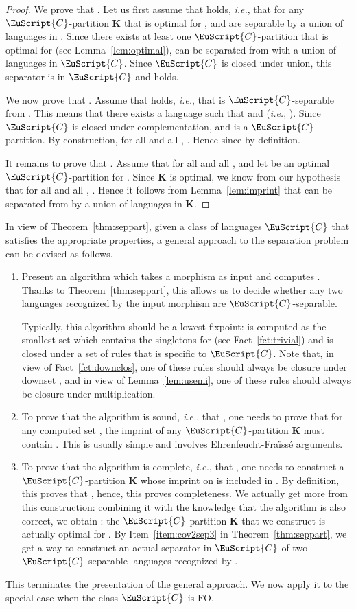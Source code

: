 \documentclass{CSML}
\newcommand\Cs{\ensuremath{\EuScript{C}}\xspace}
\newcommand\Kb{\ensuremath{\mathbf{K}}\xspace}
\newcommand{\efgame}{Ehrenfeucht-Fra\"iss\'e\xspace}
\newcommand{\fo}{\ensuremath{\text{FO}}\xspace}
\theoremstyle{plain}
\begin{document}
\begin{proof}
  We prove that .
  Let us first assume that  holds, \emph{i.e.},
  that for any \Cs-partition \Kb that is optimal for , 
  and  are separable by a union of languages in . Since
  there exists at least one \Cs-partition that is optimal for 
  (see Lemma~\ref{lem:optimal}),  can be separated from 
  with a union of languages in \Cs. Since \Cs is closed under union,
  this separator is in \Cs and  holds.

  We now prove that . Assume that  holds,
  \emph{i.e.}, that  is \Cs-separable from . This means that
  there exists a language  such that  and  (\emph{i.e.}, ). Since
  \Cs is closed under complementation,  and
   is a \Cs-partition. By construction,
  for all  and all , . Hence  since
   by definition.

  It remains to prove that . Assume that for all  and all ,  and let  be an
  optimal \Cs-partition for . Since \Kb is optimal, we know
  from our hypothesis that for all  and all , . Hence it
  follows from Lemma~\ref{lem:imprint} that  can be
  separated from  by a union of languages in \Kb.
\end{proof}

In view of Theorem~\ref{thm:seppart}, given a class of languages \Cs
that satisfies the appropriate properties, a general approach to the
separation problem can be devised as follows.
\begin{enumerate}
\item Present an algorithm which takes a morphism  as input and computes . Thanks to
  Theorem~\ref{thm:seppart}, this allows us to decide whether any two
  languages recognized by the input morphism  are \Cs-separable.

  Typically, this
  algorithm should be a lowest fixpoint:  is computed
  as the smallest set  which contains the singletons
   for  (see Fact~\ref{fct:trivial})
  and is closed under a set of rules that is specific to \Cs. Note
  that, in view of Fact~\ref{fct:downclos}, one of these rules should always be closure under downset , and in view of Lemma~\ref{lem:usemi}, one of these rules should
  always be closure under multiplication.

\item To prove that the algorithm is sound, \emph{i.e.}, that
  , one needs to prove that
  for any computed set , the imprint of any \Cs-partition \Kb must
  contain . This is usually simple and involves \efgame arguments.
\item To prove that the algorithm is complete, \emph{i.e.}, that
  , one needs to construct
  a \Cs-partition \Kb whose imprint on  is included in
  . By definition, this proves that , hence, this
  proves completeness. We actually get more from this construction:
  combining it with the knowledge that the algorithm is also correct,
  we obtain : the
  \Cs-partition \Kb that we construct is actually optimal for
  . By Item~\ref{item:cov2sep3} in Theorem~\ref{thm:seppart}, we get
  a way to construct an actual separator in \Cs of two \Cs-separable languages recognized
  by .
\end{enumerate}
This terminates the presentation of the general approach. We now apply
it to the special case when the class \Cs is \fo.
\end{document}

